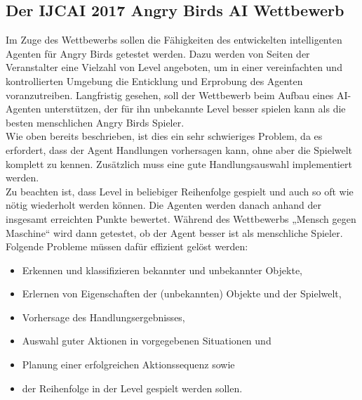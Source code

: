 \subsection{Der IJCAI 2017 Angry Birds AI Wettbewerb}
Im Zuge des Wettbewerbs sollen die Fähigkeiten des entwickelten intelligenten Agenten für Angry Birds getestet werden. Dazu werden von Seiten der Veranstalter eine Vielzahl von Level angeboten, um in einer vereinfachten und kontrollierten Umgebung die Enticklung und Erprobung des Agenten voranzutreiben. Langfristig gesehen, soll der Wettbewerb beim Aufbau eines AI-Agenten unterstützen, der für ihn unbekannte Level besser spielen kann als die besten menschlichen Angry Birds Spieler.\\
Wie oben bereits beschrieben, ist dies ein sehr schwieriges Problem, da es erfordert, dass der Agent Handlungen vorhersagen kann, ohne aber die Spielwelt komplett zu kennen. Zusätzlich muss eine gute Handlungsauswahl implementiert werden.\\
Zu beachten ist, dass Level in beliebiger Reihenfolge gespielt und auch so oft wie nötig wiederholt werden können. Die Agenten werden danach anhand der insgesamt erreichten Punkte bewertet. Während des Wettbewerbs „Mensch gegen Maschine“ wird dann getestet, ob der Agent besser ist als menschliche Spieler. Folgende Probleme müssen dafür effizient gelöst werden:

\begin{itemize}
\item Erkennen und klassifizieren bekannter und unbekannter Objekte,
\item Erlernen von Eigenschaften der (unbekannten) Objekte und der Spielwelt,
\item Vorhersage des Handlungsergebnisses,
\item Auswahl guter Aktionen in vorgegebenen Situationen und
\item Planung einer erfolgreichen Aktionssequenz sowie
\item  der Reihenfolge in der Level gespielt werden sollen.
\end{itemize}

